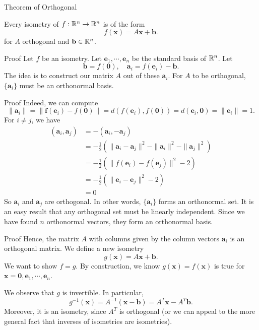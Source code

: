 \begin{frame}{Theorem of Orthogonal}
    \begin{theorem}
      Every isometry of $f: \mathbb{R}^n \to \mathbb{R}^n$ is of the form
      \[
        f(\mathbf{x}) = A\mathbf{x} + \mathbf{b}.
      \]
      for $A$ orthogonal and $\mathbf{b} \in \mathbb{R}^n$.
    \end{theorem}
\end{frame}

\begin{frame}{Proof}
    Let $f$ be an isometry. Let $\mathbf{e}_1, \cdots, \mathbf{e}_n$ be the standard basis of $\mathbb{R}^n$. Let
  \[
    \mathbf{b} = f(\mathbf{0}), \quad \mathbf{a}_i = f(\mathbf{e}_i) - \mathbf{b}.
  \]
  The idea is to construct our matrix $A$ out of these $\mathbf{a}_i$. For $A$ to be orthogonal, $\{\mathbf{a}_i\}$ must be an orthonormal basis.
\end{frame}

\begin{frame}{Proof}
    Indeed, we can compute
  \[
    \|\mathbf{a}_i\| = \|\mathbf{f}(\mathbf{e}_i) - f(\mathbf{0})\| = d(f(\mathbf{e}_i), f(\mathbf{0})) = d(\mathbf{e}_i, \mathbf{0}) = \|\mathbf{e}_i\| = 1.
  \]
  For $i \not = j$, we have
  \begin{align*}
    (\mathbf{a}_i, \mathbf{a}_j) &= -(\mathbf{a}_i, -\mathbf{a}_j) \\
    &=-\frac{1}{2}(\|\mathbf{a}_i - \mathbf{a}_j\|^2 - \|\mathbf{a}_i\|^2 - \|\mathbf{a}_j\|^2)\\
    &= -\frac{1}{2}(\|f(\mathbf{e}_i) - f(\mathbf{e}_j)\|^2 - 2)\\
    &= -\frac{1}{2}(\|\mathbf{e}_i - \mathbf{e}_j\|^2 - 2)\\
    &= 0
  \end{align*}
  So $\mathbf{a}_i$ and $\mathbf{a}_j$ are orthogonal. In other words, $\{\mathbf{a}_i\}$ forms an orthonormal set. It is an easy result that any orthogonal set must be linearly independent. Since we have found $n$ orthonormal vectors, they form an orthonormal basis.
\end{frame}

\begin{frame}{Proof}
    Hence, the matrix $A$ with columns given by the column vectors $\mathbf{a}_i$ is an orthogonal matrix. We define a new isometry
  \[
    g(\mathbf{x}) = A\mathbf{x} + \mathbf{b}.
  \]
  We want to show $f = g$. By construction, we know $g(\mathbf{x}) = f(\mathbf{x})$ is true for $\mathbf{x} = \mathbf{0}, \mathbf{e}_1, \cdots, \mathbf{e}_n$.

  We observe that $g$ is invertible. In particular,
  \[
    g^{-1}(\mathbf{x}) = A^{-1}(\mathbf{x} - \mathbf{b}) = A^T \mathbf{x} - A^T\mathbf{b}.
  \]
  Moreover, it is an isometry, since $A^T$ is orthogonal (or we can appeal to the more general fact that inverses of isometries are isometries).
\end{frame}

